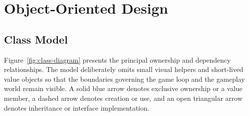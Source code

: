 \documentclass{template}
\begin{document}
\section{Object-Oriented Design}

\subsection{Class Model}

Figure~\ref{fig:class-diagram} presents the principal ownership and dependency
relationships. The model deliberately omits small visual helpers and
short-lived value objects so that the boundaries governing the game loop and
the gameplay world remain visible. A solid blue arrow denotes exclusive
ownership or a value member, a dashed arrow denotes creation or use, and an
open triangular arrow denotes inheritance or interface implementation.
\end{document}
